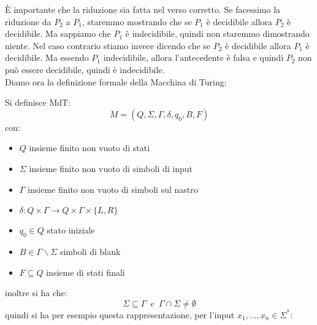\documentclass[a4paper,12pt, oneside]{book}
\begin{document}
	È importante che la riduzione sia fatta nel verso corretto. Se facessimo la riduzione da $P_2$ a $P_1$,
	staremmo mostrando che se $P_1$ è decidibile allora $P_2$ è decidibile. Ma sappiamo che $P_1$ è
	indecidibile, quindi non staremmo dimostrando niente.
	Nel caso contrario stiamo invece dicendo che se $P_2$ è decidibile allora $P_1$ è decidibile. Ma essendo
$P_1$ indecidibile, allora l'antecedente è falsa e quindi $P_2$ non può essere decidibile, quindi è
	indecidibile.\\
	Diamo ora la definizione formale della Macchina di Turing:
	\begin{definizione}
		Si definisce MdT:
		$$M=(Q,\Sigma,\Gamma,\delta,q_0,B,F)$$
		con:
		\begin{itemize}
			\item $Q$ insieme finito non vuoto di stati
			\item $\Sigma$ insieme finito non vuoto di simboli di input
			\item $\Gamma$ insieme finito non vuoto di simboli sul nastro
			\item $\delta:Q\times\Gamma\to Q\times\Gamma\times\{L,R\}$
			\item $q_0\in Q$ stato iniziale
			\item $B\in\Gamma\backslash\Sigma$ simboli di blank
			\item $F\subseteq Q$ insieme di stati finali
		\end{itemize}
		inoltre si ha che:
		$$\Sigma\subseteq \Gamma\,\,\,e\,\,\,\Gamma\cap\Sigma\neq\emptyset$$
		quindi si ha per esempio questa rappresentazione, per l'input $x_1,...,x_n\in\Sigma^*$:
		\begin{center}


\end{center}
\end{definizione}
\end{document}
